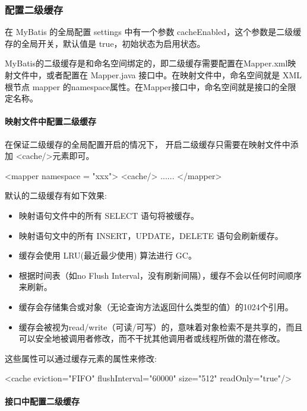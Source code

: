 \subsubsection{配置二级缓存}

在 MyBatis 的全局配置 settings 中有一个参数 cacheEnabled，这个参数是二级缓存的全局开关，默认值是 true，初始状态为启用状态。

MyBatis的二级缓存是和命名空间绑定的，即二级缓存需要配置在Mapper.xml映射文件中，或者配置在 Mapper.java 接口中。在映射文件中，命名空间就是 XML 根节点 mapper 的namespace属性。在Mapper接口中，命名空间就是接口的全限定名称。

\paragraph*{映射文件中配置二级缓存}

在保证二级缓存的全局配置开启的情况下， 开启二级缓存只需要在映射文件中添加 <cache/>元素即可。

\begin{xml}
<mapper namespace = "xxx">
    <cache/>
    ......
</mapper>
\end{xml}

默认的二级缓存有如下效果:
\begin{itemize}
    \item 映射语句文件中的所有 SELECT 语句将被缓存。
    \item 映射语句文中的所有 INSERT，UPDATE，DELETE 语句会刷新缓存。
    \item 缓存会使用 LRU(最近最少使用) 算法进行 GC。
    \item 根据时间表（如no Flush Interval，没有刷新间隔），缓存不会以任何时间顺序来刷新。
    \item 缓存会存储集合或对象（无论查询方法返回什么类型的值）的1024个引用。
    \item 缓存会被视为read/write（可读/可写）的，意味着对象检索不是共享的，而且可以安全地被调用者修改，而不干扰其他调用者或线程所做的潜在修改。
\end{itemize}

这些属性可以通过缓存元素的属性来修改:

\begin{xml}
<cache eviction="FIFO" flushInterval="60000" size="512" readOnly="true"/>
\end{xml}

\paragraph*{接口中配置二级缓存}

